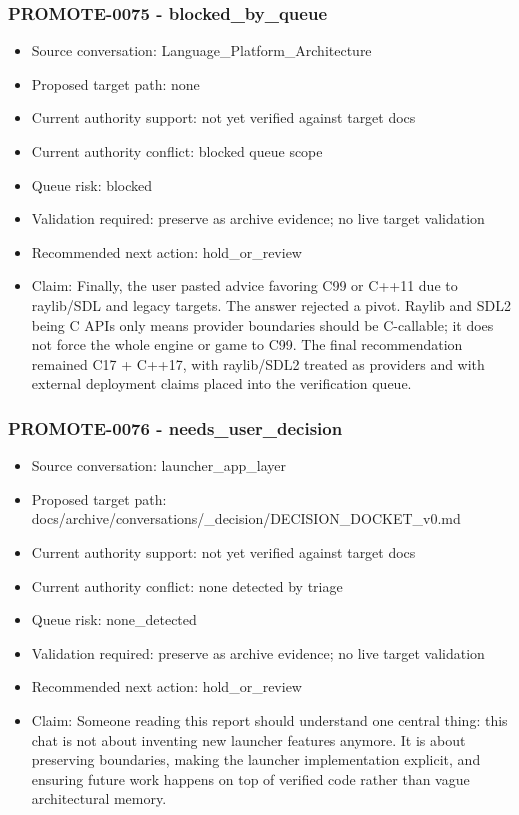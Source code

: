 \documentclass[11pt,a4paper]{report}
\begin{document}
\subsubsection{PROMOTE-0075 - blocked\_by\_queue}

\begin{itemize}
\item Source conversation: Language\_Platform\_Architecture
\item Proposed target path: none
\item Current authority support: not yet verified against target docs
\item Current authority conflict: blocked queue scope
\item Queue risk: blocked
\item Validation required: preserve as archive evidence; no live target validation
\item Recommended next action: hold\_or\_review
\item Claim: Finally, the user pasted advice favoring C99 or C++11 due to raylib/SDL and legacy targets. The answer rejected a pivot. Raylib and SDL2 being C APIs only means provider boundaries should be C-callable; it does not force the whole engine or game to C99. The final recommendation remained C17 + C++17, with raylib/SDL2 treated as providers and with external deployment claims placed into the verification queue.
\end{itemize}

\subsubsection{PROMOTE-0076 - needs\_user\_decision}

\begin{itemize}
\item Source conversation: launcher\_app\_layer
\item Proposed target path: docs/archive/conversations/\_decision/DECISION\_DOCKET\_v0.md
\item Current authority support: not yet verified against target docs
\item Current authority conflict: none detected by triage
\item Queue risk: none\_detected
\item Validation required: preserve as archive evidence; no live target validation
\item Recommended next action: hold\_or\_review
\item Claim: Someone reading this report should understand one central thing: this chat is not about inventing new launcher features anymore. It is about preserving boundaries, making the launcher implementation explicit, and ensuring future work happens on top of verified code rather than vague architectural memory.
\end{itemize}
\end{document}
